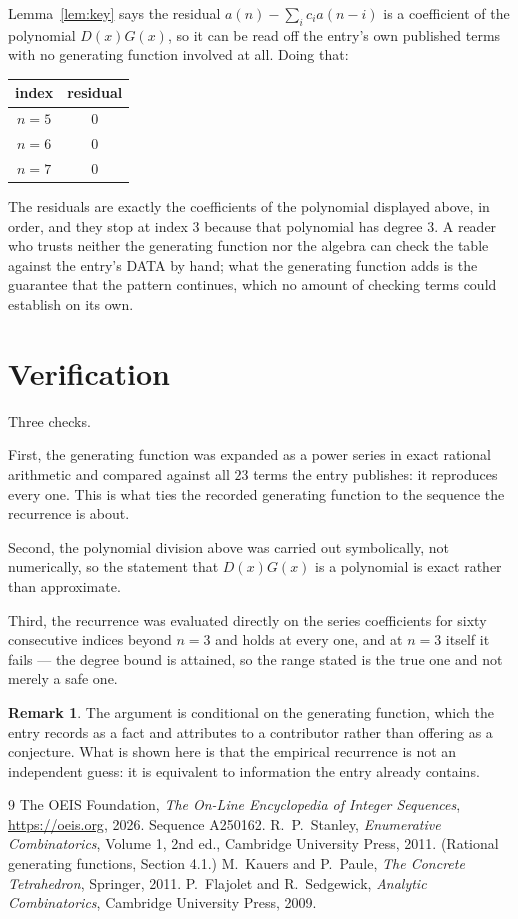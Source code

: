 \documentclass[11pt,a4paper]{article}
\theoremstyle{plain}
\theoremstyle{definition}
\newtheorem{remark}[theorem]{Remark}
\begin{document}
Lemma~\ref{lem:key} says the residual $a(n)-\sum_ic_ia(n-i)$ is a coefficient of the
polynomial $D(x)G(x)$, so it can be read off the entry's own published terms with no
generating function involved at all. Doing that:
\begin{center}
\begin{tabular}{cc}
index & residual \\ \hline
$n=5$ & $0$ \\
$n=6$ & $0$ \\
$n=7$ & $0$
\end{tabular}
\end{center}
The residuals are exactly the coefficients of the polynomial displayed above, in order, and
they stop at index $3$ because that polynomial has degree $3$. A reader who trusts
neither the generating function nor the algebra can check the table against the entry's DATA
by hand; what the generating function adds is the guarantee that the pattern continues, which
no amount of checking terms could establish on its own.

\section{Verification}

Three checks.

First, the generating function was expanded as a power series in exact rational arithmetic and
compared against all $23$ terms the entry publishes: it reproduces every one. This is
what ties the recorded generating function to the sequence the recurrence is about.

Second, the polynomial division above was carried out symbolically, not numerically, so the
statement that $D(x)G(x)$ is a polynomial is exact rather than approximate.

Third, the recurrence was evaluated directly on the series coefficients for sixty consecutive
indices beyond $n=3$ and holds at every one, and at $n=3$ itself it fails --- the
degree bound is attained, so the range stated is the true one and not merely a safe one.

\begin{remark}
The argument is conditional on the generating function, which the entry records as a fact and
attributes to a contributor rather than offering as a conjecture. What is shown here is that
the empirical recurrence is not an independent guess: it is equivalent to information the
entry already contains.
\end{remark}

\begin{thebibliography}{9}
 The OEIS Foundation, \emph{The On-Line Encyclopedia of Integer
Sequences}, \url{https://oeis.org}, 2026. Sequence A250162.
 R.~P.~Stanley, \emph{Enumerative Combinatorics}, Volume 1, 2nd ed.,
Cambridge University Press, 2011. (Rational generating functions, Section 4.1.)
 M.~Kauers and P.~Paule, \emph{The Concrete Tetrahedron}, Springer, 2011.
 P.~Flajolet and R.~Sedgewick, \emph{Analytic Combinatorics}, Cambridge
University Press, 2009.
\end{thebibliography}
\end{document}
